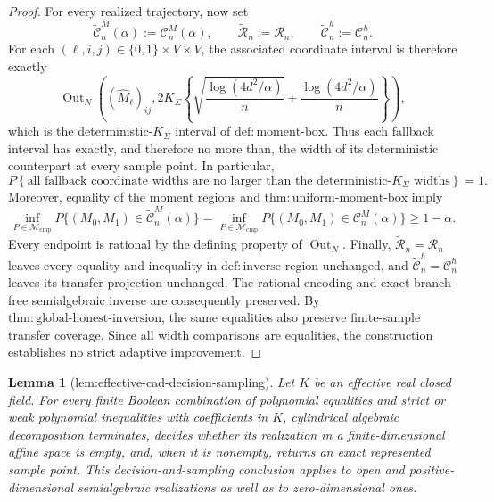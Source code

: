\documentclass{article}
\newtheorem{lemma}{Lemma}
\begin{document}
\begin{proof}
For every realized trajectory, now set
\[
 \widetilde{\mathcal C}_n^M(\alpha):=\mathcal C_n^M(\alpha),
 \qquad
 \widetilde{\mathcal R}_n:=\mathcal R_n,
 \qquad
 \widetilde{\mathcal C}_n^h:=\mathcal C_n^h.
\]
For each \((\ell,i,j)\in\{0,1\}\times V\times V\), the associated
coordinate interval is therefore exactly
\[
 \operatorname{Out}_N\!\left((\widehat M_\ell)_{ij},
 2K_\Sigma\left\{
 \sqrt{\frac{\log(4d^2/\alpha)}{n}}
 +\frac{\log(4d^2/\alpha)}{n}\right\}\right),
\]
which is the deterministic-\(K_\Sigma\) interval of
\(\mathrm{def{:}moment\mbox{-}box}\).  Thus each fallback interval has
exactly, and therefore no more than, the width of its deterministic
counterpart at every sample point.  In particular,
\[
 P\!\left\{\text{all fallback coordinate widths are no larger than the
 deterministic-\(K_\Sigma\) widths}\right\}=1.
\]
Moreover, equality of the moment regions and
\(\mathrm{thm{:}uniform\mbox{-}moment\mbox{-}box}\) imply
\[
 \inf_{P\in\mathcal M_{\mathrm{cmp}}}
 P\{(M_0,M_1)\in\widetilde{\mathcal C}_n^M(\alpha)\}
 =
 \inf_{P\in\mathcal M_{\mathrm{cmp}}}
 P\{(M_0,M_1)\in\mathcal C_n^M(\alpha)\}
 \geq1-\alpha.
\]
Every endpoint is rational by the defining property of
\(\operatorname{Out}_N\).  Finally,
\(\widetilde{\mathcal R}_n=\mathcal R_n\) leaves every equality and
inequality in \(\mathrm{def{:}inverse\mbox{-}region}\) unchanged, and
\(\widetilde{\mathcal C}_n^h=\mathcal C_n^h\) leaves its transfer
projection unchanged.  The rational encoding and exact branch-free
semialgebraic inverse are consequently preserved.  By
\(\mathrm{thm{:}global\mbox{-}honest\mbox{-}inversion}\), the same
equalities also preserve finite-sample transfer coverage.  Since all width
comparisons are equalities, the construction establishes no strict adaptive
improvement.
\end{proof}

\begin{lemma}[lem:effective-cad-decision-sampling]\label{lem:effective-cad-decision-sampling}
Let \(K\) be an effective real closed field.  For every finite Boolean combination of polynomial equalities and strict or weak polynomial inequalities with coefficients in \(K\), cylindrical algebraic decomposition terminates, decides whether its realization in a finite-dimensional affine space is empty, and, when it is nonempty, returns an exact represented sample point.  This decision-and-sampling conclusion applies to open and positive-dimensional semialgebraic realizations as well as to zero-dimensional ones.
\end{lemma}
\end{document}
